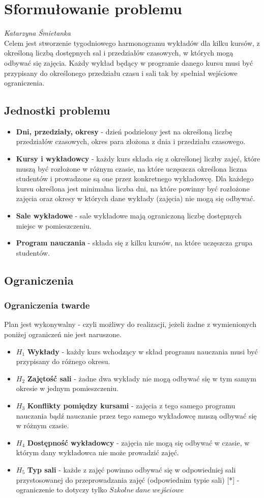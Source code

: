 \section{Sformułowanie problemu}
\textit{Katarzyna Śmietanka} \\
Celem jest stworzenie tygodniowego harmonogramu wykładów dla kilku kursów, z określoną liczbą dostępnych sal i przedziałów czasowych, w których mogą odbywać się zajęcia. Każdy wykład będący w programie danego kursu musi być przypisany do określonego przedziału czasu i sali tak by spełniał wejściowe ograniczenia. 
\subsection{Jednostki problemu}
\begin{itemize}
\item{\textbf{Dni, przedziały, okresy} - dzień podzielony jest na określoną liczbę przedziałów czasowych, okres para złożona z dnia i przedziału czasowego.}
\item{\textbf{Kursy i wykładowcy} - każdy kurs składa się z określonej liczby zajęć, które muszą być rozłożone w różnym czasie, na które uczęszcza określona liczna studentów i prowadzone są one przez konkretnego wykładowcę. Dla każdego kursu określona jest minimalna liczba dni, na które powinny być rozłożone zajęcia oraz okresy w których dane wykłady (zajęcia) nie mogą się odbywać.}
\item{\textbf{Sale wykładowe} - sale wykładowe mają ograniczoną liczbę dostępnych miejsc w pomieszczeniu.}
\item{\textbf{Program nauczania} - składa się z kilku kursów, na które uczęszcza grupa studentów.}
\end{itemize}
\subsection{Ograniczenia}
\subsubsection{Ograniczenia twarde}
Plan jest wykonywalny - czyli możliwy do realizacji, jeżeli żadne z wymienionych poniżej ograniczeń nie jest naruszone.
\begin{itemize}
\item  ${H_{1}}$ \textbf{Wykłady} - każdy kurs wchodzący w skład programu nauczania musi być przypisany do różnego okresu.
\item  ${H_{2}}$ \textbf{Zajętość sali} - żadne dwa wykłady nie mogą odbywać się w tym samym okresie w jednym pomieszczeniu.
\item  ${H_{3}}$ \textbf{Konflikty pomiędzy kursami} - zajęcia z tego samego programu nauczania bądź nauczanie przez tego samego wykładowcę muszą odbywać się w różnym czasie.
\item  ${H_{4}}$ \textbf{Dostępność wykładowcy} - zajęcia nie mogą się odbywać w czasie, w którym dany wykładowca nie może prowadzić zajęć.
\item ${H_{5}}$ \textbf{Typ sali} - każde z zajęć powinno odbywać się w odpowiedniej sali przystosowanej do przeprowadzania zajęć (odpowiednim typie sali) [*] - ograniczenie to dotyczy tylko $Szkolne\ dane\ wejściowe$
\end{itemize}
